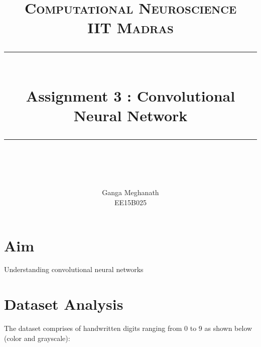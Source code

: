 \documentclass{article} %
\title{
\normalfont \normalsize 
\textsc{Computational Neuroscience \\ 
IIT Madras} \\
[10pt] 
\rule{\linewidth}{0.5pt} \\[6pt] 
\huge Assignment 3 : Convolutional Neural Network \\
\rule{\linewidth}{2pt}  \\[10pt]
}
\author{Ganga Meghanath \\
EE15B025}
\begin{document}
\maketitle



%
%
%
%





\section{Aim}

Understanding convolutional neural networks

\section{Dataset Analysis}
The dataset comprises of handwritten digits ranging from 0 to 9 as shown below (color and grayscale):
\end{document}
